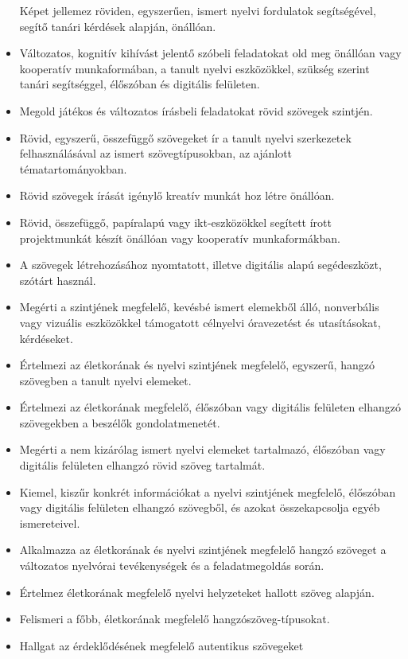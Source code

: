 \begin{itemize}
  Képet jellemez röviden, egyszerűen, ismert nyelvi fordulatok
  segítségével, segítő tanári kérdések alapján, önállóan.
\item
  Változatos, kognitív kihívást jelentő szóbeli feladatokat old meg
  önállóan vagy kooperatív munkaformában, a tanult nyelvi eszközökkel,
  szükség szerint tanári segítséggel, élőszóban és digitális felületen.
\item
  Megold játékos és változatos írásbeli feladatokat rövid szövegek
  szintjén.
\item
  Rövid, egyszerű, összefüggő szövegeket ír a tanult nyelvi szerkezetek
  felhasználásával az ismert szövegtípusokban, az ajánlott
  tématartományokban.
\item
  Rövid szövegek írását igénylő kreatív munkát hoz létre önállóan.
\item
  Rövid, összefüggő, papíralapú vagy ikt-eszközökkel segített írott
  projektmunkát készít önállóan vagy kooperatív munkaformákban.
\item
  A szövegek létrehozásához nyomtatott, illetve digitális alapú
  segédeszközt, szótárt használ.
\item
  Megérti a szintjének megfelelő, kevésbé ismert elemekből álló,
  nonverbális vagy vizuális eszközökkel támogatott célnyelvi óravezetést
  és utasításokat, kérdéseket.
\item
  Értelmezi az életkorának és nyelvi szintjének megfelelő, egyszerű,
  hangzó szövegben a tanult nyelvi elemeket.
\item
  Értelmezi az életkorának megfelelő, élőszóban vagy digitális felületen
  elhangzó szövegekben a beszélők gondolatmenetét.
\item
  Megérti a nem kizárólag ismert nyelvi elemeket tartalmazó, élőszóban
  vagy digitális felületen elhangzó rövid szöveg tartalmát.
\item
  Kiemel, kiszűr konkrét információkat a nyelvi szintjének megfelelő,
  élőszóban vagy digitális felületen elhangzó szövegből, és azokat
  összekapcsolja egyéb ismereteivel.
\item
  Alkalmazza az életkorának és nyelvi szintjének megfelelő hangzó
  szöveget a változatos nyelvórai tevékenységek és a feladatmegoldás
  során.
\item
  Értelmez életkorának megfelelő nyelvi helyzeteket hallott szöveg
  alapján.
\item
  Felismeri a főbb, életkorának megfelelő hangzószöveg-típusokat.
\item
  Hallgat az érdeklődésének megfelelő autentikus szövegeket

\end{itemize}
